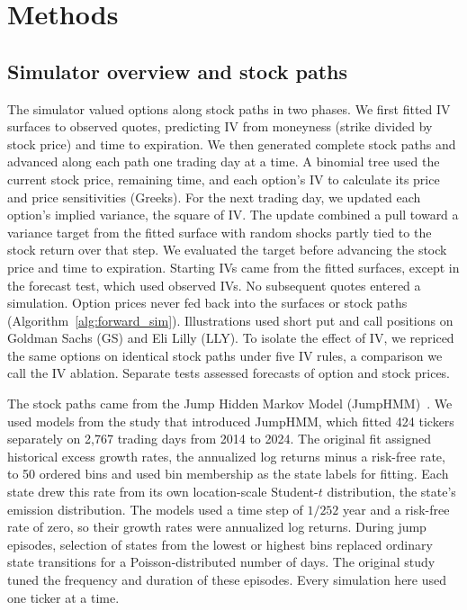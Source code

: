 \section{Methods}\label{sec:methods}

\subsection{Simulator overview and stock paths}

The simulator valued options along stock paths in two phases. We first fitted IV surfaces to observed quotes, predicting IV from moneyness (strike divided by stock price) and time to expiration. We then generated complete stock paths and advanced along each path one trading day at a time. A binomial tree used the current stock price, remaining time, and each option's IV to calculate its price and price sensitivities (Greeks). For the next trading day, we updated each option's implied variance, the square of IV. The update combined a pull toward a variance target from the fitted surface with random shocks partly tied to the stock return over that step. We evaluated the target before advancing the stock price and time to expiration. Starting IVs came from the fitted surfaces, except in the forecast test, which used observed IVs. No subsequent quotes entered a simulation. Option prices never fed back into the surfaces or stock paths (Algorithm~\ref{alg:forward_sim}). Illustrations used short put and call positions on Goldman Sachs (GS) and Eli Lilly (LLY). To isolate the effect of IV, we repriced the same options on identical stock paths under five IV rules, a comparison we call the IV ablation. Separate tests assessed forecasts of option and stock prices.

The stock paths came from the Jump Hidden Markov Model (JumpHMM)~\cite{jumphmm2025}. We used models from the study that introduced JumpHMM, which fitted 424 tickers separately on 2{,}767 trading days from 2014 to 2024. The original fit assigned historical excess growth rates, the annualized log returns minus a risk-free rate, to 50 ordered bins and used bin membership as the state labels for fitting. Each state drew this rate from its own location-scale Student-$t$ distribution, the state's emission distribution. The models used a time step of $1/252$ year and a risk-free rate of zero, so their growth rates were annualized log returns. During jump episodes, selection of states from the lowest or highest bins replaced ordinary state transitions for a Poisson-distributed number of days. The original study tuned the frequency and duration of these episodes. Every simulation here used one ticker at a time.

